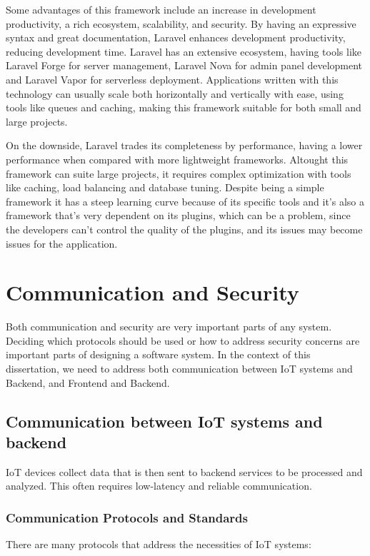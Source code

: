 Some advantages of this framework include an increase in development
productivity, a rich ecosystem, scalability, and security.
By having an expressive syntax and great documentation, Laravel enhances
development productivity, reducing development time.
Laravel has an extensive ecosystem, having tools like Laravel Forge for server
management, Laravel Nova for admin panel development and Laravel Vapor for
serverless deployment.
Applications written with this technology can usually scale both horizontally
and vertically with ease, using tools like queues and caching, making this
framework suitable for both small and large projects.

On the downside, Laravel trades its completeness by performance, having a
lower performance when compared with more lightweight frameworks.
Altought this framework can suite large projects, it requires complex
optimization with tools like caching, load balancing and database tuning.
Despite being a simple framework it has a steep learning curve because of its
specific tools and it's also a framework that's very dependent on its plugins,
which can be a problem, since the developers can't control the quality of the
plugins, and its issues may become issues for the application.

\section{Communication and Security}
Both communication and security are very important parts of any system.
Deciding which protocols should be used or how to address security concerns are
important parts of designing a software system. In the context of this
dissertation, we need to address both communication between IoT systems and
Backend, and Frontend and Backend.


\subsection{Communication between IoT systems and backend}
IoT devices collect data that is then sent to backend services to be processed
and analyzed. This often requires low-latency and reliable communication.
\subsubsection{Communication Protocols and Standards}
There are many protocols that address the necessities of IoT systems:

